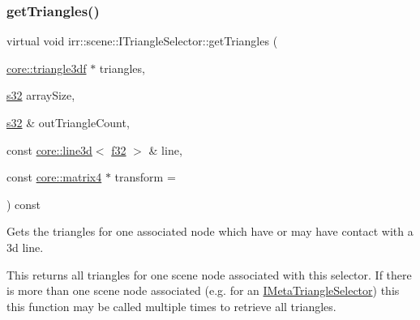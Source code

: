 \subsubsection{\texorpdfstring{get\+Triangles()}{getTriangles()}\hspace{0.1cm}{\footnotesize\ttfamily [5/6]}}
{\footnotesize\ttfamily virtual void irr\+::scene\+::\+I\+Triangle\+Selector\+::get\+Triangles (\begin{DoxyParamCaption}\item[{\hyperlink{namespaceirr_1_1core_a8983bda2678a7a67d97bf3c7be6c31c7}{core\+::triangle3df} $\ast$}]{triangles,  }\item[{\hyperlink{namespaceirr_ac66849b7a6ed16e30ebede579f9b47c6}{s32}}]{array\+Size,  }\item[{\hyperlink{namespaceirr_ac66849b7a6ed16e30ebede579f9b47c6}{s32} \&}]{out\+Triangle\+Count,  }\item[{const \hyperlink{classirr_1_1core_1_1line3d}{core\+::line3d}$<$ \hyperlink{namespaceirr_a0277be98d67dc26ff93b1a6a1d086b07}{f32} $>$ \&}]{line,  }\item[{const \hyperlink{namespaceirr_1_1core_a4c9d4e29899535971052810954a14431}{core\+::matrix4} $\ast$}]{transform = {} }\end{DoxyParamCaption}) const\hspace{0.3cm}{\ttfamily [pure virtual]}}



Gets the triangles for one associated node which have or may have contact with a 3d line. 

This returns all triangles for one scene node associated with this selector. If there is more than one scene node associated (e.\+g. for an \hyperlink{classirr_1_1scene_1_1IMetaTriangleSelector}{I\+Meta\+Triangle\+Selector}) this this function may be called multiple times to retrieve all triangles.

